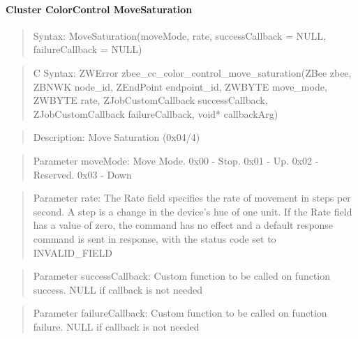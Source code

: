 \paragraph{Cluster ColorControl MoveSaturation}
\begin{quote}Syntax: MoveSaturation(moveMode, rate, successCallback = NULL, failureCallback = NULL)\end{quote}
\begin{quote}C Syntax: ZWError zbee\_cc\_color\_control\_move\_saturation(ZBee zbee, ZBNWK node\_id, ZEndPoint endpoint\_id, ZWBYTE move\_mode, ZWBYTE rate, ZJobCustomCallback successCallback, ZJobCustomCallback failureCallback, void* callbackArg)\end{quote}
\begin{quote}Description: Move Saturation (0x04/4)\end{quote}
\begin{quote}Parameter moveMode: Move Mode. 0x00 - Stop. 0x01 - Up. 0x02 - Reserved. 0x03 - Down\end{quote}
\begin{quote}Parameter rate: The Rate field specifies the rate of movement in steps per second. A step is a change in the device’s hue of one unit. If the Rate field has a value of zero, the command has no effect and a default response command is sent in response, with the status code set to INVALID\_FIELD\end{quote}
\begin{quote}Parameter successCallback: Custom function to be called on function success. NULL if callback is not needed\end{quote}
\begin{quote}Parameter failureCallback: Custom function to be called on function failure. NULL if callback is not needed\end{quote}


